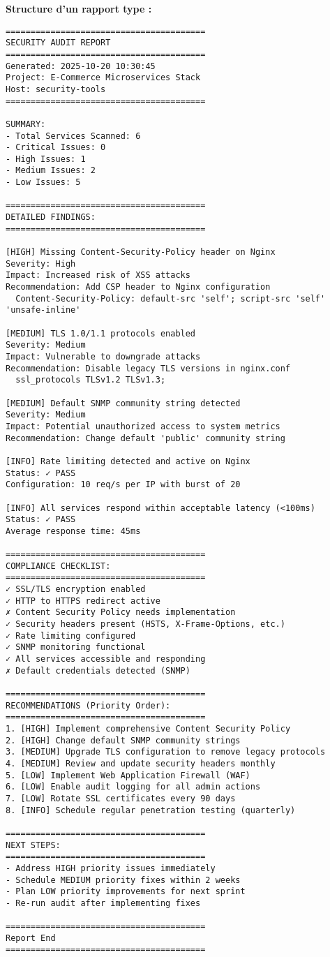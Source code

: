 \documentclass[11pt,a4paper]{report}
\begin{document}
\textbf{Structure d'un rapport type :}

\begin{lstlisting}[caption=Exemple de Rapport de Sécurité Généré, basicstyle=\ttfamily\tiny]
========================================
SECURITY AUDIT REPORT
========================================
Generated: 2025-10-20 10:30:45
Project: E-Commerce Microservices Stack
Host: security-tools
========================================

SUMMARY:
- Total Services Scanned: 6
- Critical Issues: 0
- High Issues: 1
- Medium Issues: 2
- Low Issues: 5

========================================
DETAILED FINDINGS:
========================================

[HIGH] Missing Content-Security-Policy header on Nginx
Severity: High
Impact: Increased risk of XSS attacks
Recommendation: Add CSP header to Nginx configuration
  Content-Security-Policy: default-src 'self'; script-src 'self' 'unsafe-inline'

[MEDIUM] TLS 1.0/1.1 protocols enabled
Severity: Medium
Impact: Vulnerable to downgrade attacks
Recommendation: Disable legacy TLS versions in nginx.conf
  ssl_protocols TLSv1.2 TLSv1.3;

[MEDIUM] Default SNMP community string detected
Severity: Medium
Impact: Potential unauthorized access to system metrics
Recommendation: Change default 'public' community string

[INFO] Rate limiting detected and active on Nginx
Status: ✓ PASS
Configuration: 10 req/s per IP with burst of 20

[INFO] All services respond within acceptable latency (<100ms)
Status: ✓ PASS
Average response time: 45ms

========================================
COMPLIANCE CHECKLIST:
========================================
✓ SSL/TLS encryption enabled
✓ HTTP to HTTPS redirect active
✗ Content Security Policy needs implementation
✓ Security headers present (HSTS, X-Frame-Options, etc.)
✓ Rate limiting configured
✓ SNMP monitoring functional
✓ All services accessible and responding
✗ Default credentials detected (SNMP)

========================================
RECOMMENDATIONS (Priority Order):
========================================
1. [HIGH] Implement comprehensive Content Security Policy
2. [HIGH] Change default SNMP community strings
3. [MEDIUM] Upgrade TLS configuration to remove legacy protocols
4. [MEDIUM] Review and update security headers monthly
5. [LOW] Implement Web Application Firewall (WAF)
6. [LOW] Enable audit logging for all admin actions
7. [LOW] Rotate SSL certificates every 90 days
8. [INFO] Schedule regular penetration testing (quarterly)

========================================
NEXT STEPS:
========================================
- Address HIGH priority issues immediately
- Schedule MEDIUM priority fixes within 2 weeks
- Plan LOW priority improvements for next sprint
- Re-run audit after implementing fixes

========================================
Report End
========================================
\end{lstlisting}
\end{document}

